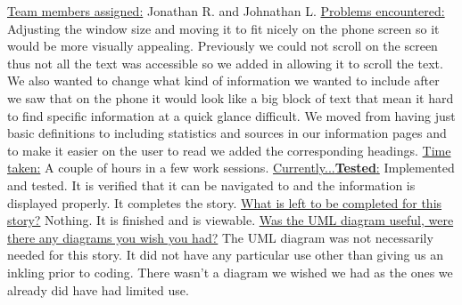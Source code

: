 \documentclass[letterpaper,12pt,titlepage]{article}
\begin{document}
\underline{Team members assigned:}
Jonathan R. and Johnathan L.
\newline
\underline{Problems encountered:}
Adjusting the window size and moving it to fit nicely on the phone screen so it would be more visually appealing. Previously we could not scroll on the screen thus not all the text was accessible so we added in allowing it to scroll the text. We also wanted to change what kind of information we wanted to include after we saw that on the phone it would look like a big block of text that mean it hard to find specific information at a quick glance difficult. We moved from having just basic definitions to including statistics and sources in our information pages and to make it easier on the user to read we added the corresponding headings.
\newline
\underline{Time taken:}
A couple of hours in a few work sessions.
\newline
\underline{Currently...\textbf{Tested}:}
Implemented and tested. It is verified that it can be navigated to and the information is displayed properly. It completes the story.
\newline
\underline{What is left to be completed for this story?}
Nothing. It is finished and is viewable.
\newline
\underline{Was the UML diagram useful, were there any diagrams you wish you had?}
The UML diagram was not necessarily needed for this story. It did not have any particular use other than giving us an inkling prior to coding. There wasn’t a diagram we wished we had as the ones we already did have had limited use.
\newline
\newline

\noindent
\newpage
\end{document}
